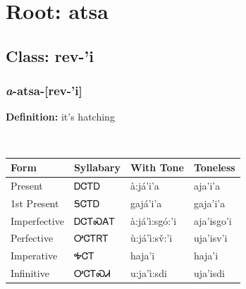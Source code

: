 \needspace{4in}
\section*{Root: atsa}
\nopagebreak
{}
\needspace{3in}
\subsection*{Class: rev-'i}
\nopagebreak
\needspace{2in}
\subsubsection*{\textit{a}{-}\textbf{atsa}{-}[rev-'i]}
\nopagebreak
\textbf{Definition: } it{\textquoteright}s hatching
\\[0.5em]
\begin{tabularx}{\textwidth}{l X X X}%
\toprule%
\textbf{Form}&\textbf{Syllabary}&\textbf{With Tone}&\textbf{Toneless}\\%
\midrule%
Present&ᎠᏣᎢᎠ&à:já’i’a&aja’i’a\\%
1st Present&ᎦᏣᎢᎠ&gajá’i’a&gaja’i’a\\%
Imperfective&ᎠᏣᎢᏍᎪᎢ&à:já’ì:sgó:’i&aja’isgo’i\\%
Perfective&ᎤᏣᎢᏒᎢ&ù:já’ì:sv̌:’i&uja’isv’i\\%
Imperative&ᎭᏣᎢ&haja’i&haja’i\\%
Infinitive&ᎤᏣᎢᏍᏗ&u:ja’ì:sdi&uja’isdi\\%
\bottomrule%
\end{tabularx}
\\[1em]
